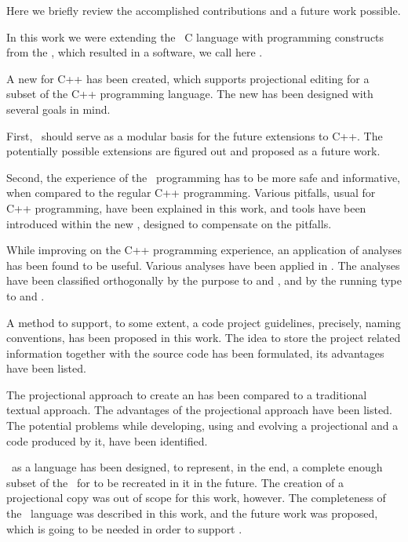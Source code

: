 
Here we briefly review the accomplished contributions and a future work possible.


In this work we were extending the \mbdr\ C language with programming constructs from the \cpppl, which 
resulted in a software, we call here  \pcpp. 

A new  for C++ has been created, which supports projectional editing for 
a subset of the C++ programming language. The new  has been designed with several goals 
in mind.

First,  \pcpp\ should serve as a modular basis for the future extensions to C++. The 
potentially possible extensions are figured out and proposed as a future 
work.

Second, the experience of the \pcpp\ programming has to be more safe and informative,
when compared to the regular C++ programming. Various pitfalls, usual for C++ programming,
have been explained in this work, and tools have been introduced within the new ,
designed to compensate on the pitfalls.

While improving on the C++ programming experience, an application of analyses has been
found to be useful. Various analyses have been applied in \pcpp. The analyses have been
classified orthogonally by the purpose to  and ,
and by the running type to  and .


A method to support, to some extent, a code project guidelines, precisely, naming conventions,
has been proposed in this work. The idea to store the project related information together 
with the source code has been formulated, its advantages have been listed.

The projectional approach to create an  has been compared to a traditional textual approach.
The advantages of the projectional approach have been listed. The potential problems while developing,
using and evolving a projectional  and a code produced by it, have been identified.

\pcpp\ as a language has been designed, to represent, in the end, a complete enough subset 
of the \cpppl\ for   to be recreated in it in the future. The creation of a 
projectional  copy was out of scope for this work, however.
The completeness of the \pcpp\ language was described in this work, and
the future work was proposed, which is going to be needed in order to support .

